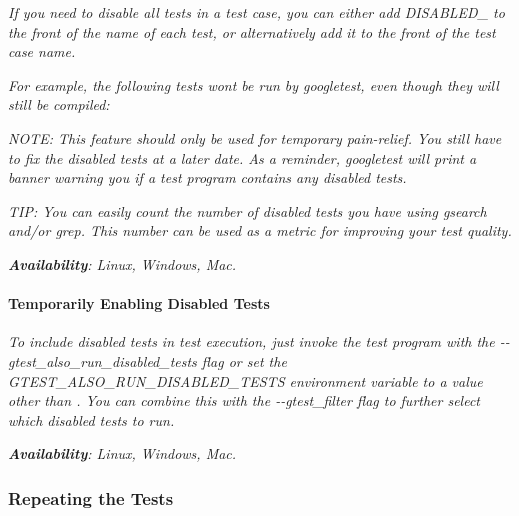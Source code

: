 {\itshape If you need to disable all tests in a test case, you can either add {\ttfamily D\+I\+S\+A\+B\+L\+E\+D\+\_\+} to the front of the name of each test, or alternatively add it to the front of the test case name.}

{\itshape For example, the following tests won\textquotesingle{}t be run by googletest, even though they will still be compiled\+:}

{\itshape 
\begin{DoxyCode}{0}
\DoxyCodeLine{}
\DoxyCodeLine{}
\end{DoxyCode}
}

{\itshape N\+O\+TE\+: This feature should only be used for temporary pain-\/relief. You still have to fix the disabled tests at a later date. As a reminder, googletest will print a banner warning you if a test program contains any disabled tests.}

{\itshape T\+IP\+: You can easily count the number of disabled tests you have using {\ttfamily gsearch} and/or {\ttfamily grep}. This number can be used as a metric for improving your test quality.}

{\itshape {\bfseries{Availability}}\+: Linux, Windows, Mac.}

{\itshape \paragraph*{Temporarily Enabling Disabled Tests}}

{\itshape }

{\itshape To include disabled tests in test execution, just invoke the test program with the {\ttfamily -\/-\/gtest\+\_\+also\+\_\+run\+\_\+disabled\+\_\+tests} flag or set the {\ttfamily G\+T\+E\+S\+T\+\_\+\+A\+L\+S\+O\+\_\+\+R\+U\+N\+\_\+\+D\+I\+S\+A\+B\+L\+E\+D\+\_\+\+T\+E\+S\+TS} environment variable to a value other than {}. You can combine this with the {\ttfamily -\/-\/gtest\+\_\+filter} flag to further select which disabled tests to run.}

{\itshape {\bfseries{Availability}}\+: Linux, Windows, Mac.}

{\itshape \subsubsection*{Repeating the Tests}}

